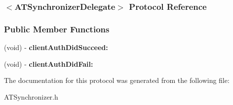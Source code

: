 \hypertarget{protocol_a_t_synchronizer_delegate-p}{
\subsubsection{$<$ATSynchronizerDelegate$>$ Protocol Reference}
\label{protocol_a_t_synchronizer_delegate-p}
}
\subsubsection*{Public Member Functions}
\begin{DoxyCompactItemize}
\item 
\hypertarget{protocol_a_t_synchronizer_delegate-p_a5ef10b52a53f28e5f16cb76c2e9af9b8}{
(void) -\/ {\bfseries clientAuthDidSucceed:}}
\label{protocol_a_t_synchronizer_delegate-p_a5ef10b52a53f28e5f16cb76c2e9af9b8}

\item 
\hypertarget{protocol_a_t_synchronizer_delegate-p_a25d978a721f2bd286b9e063a1987f45d}{
(void) -\/ {\bfseries clientAuthDidFail:}}
\label{protocol_a_t_synchronizer_delegate-p_a25d978a721f2bd286b9e063a1987f45d}

\end{DoxyCompactItemize}


The documentation for this protocol was generated from the following file:\begin{DoxyCompactItemize}
\item 
ATSynchronizer.h\end{DoxyCompactItemize}
